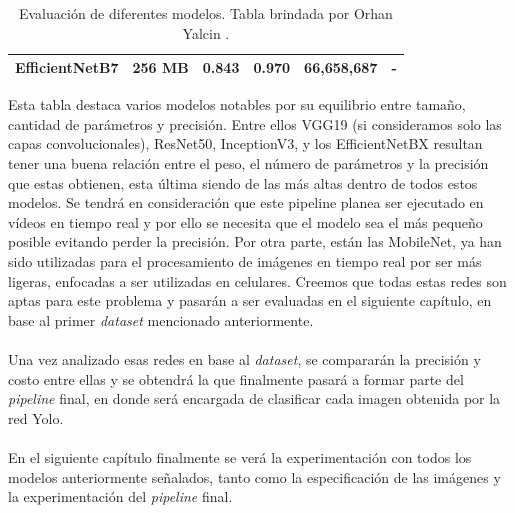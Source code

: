 \begin{table}[h!]
\begin{tabular}{|l|r|r|r|r|r|}
    EfficientNetB7                                               & 256 MB                             & 0.843                                                                                   & 0.970                                                                                   & 66,658,687                               & -                                   \\ \hline
    \end{tabular}
    \caption{Evaluación de diferentes modelos. Tabla brindada por Orhan Yalcin \protect\cite{DataModelos}. }
    \label{evaluación}
\end{table}


Esta tabla destaca varios modelos notables por su equilibrio entre 
tamaño, cantidad de parámetros y precisión. Entre ellos VGG19 
(si consideramos solo las capas convolucionales), ResNet50, InceptionV3, 
y los EfficientNetBX resultan tener una buena relación entre el peso, el 
número de parámetros y la precisión que estas obtienen, esta última 
siendo de las más altas dentro de todos estos modelos. Se tendrá en 
consideración que este pipeline planea ser ejecutado en vídeos en tiempo 
real y por ello se necesita que el modelo sea el más pequeño posible 
evitando perder la precisión. Por otra parte, están las MobileNet, ya han 
sido utilizadas para el procesamiento de imágenes en tiempo real por ser 
más ligeras, enfocadas a ser utilizadas en celulares. Creemos que todas 
estas redes son aptas para este problema y pasarán a ser evaluadas en el 
siguiente capítulo, en base al primer \textit{dataset} mencionado 
anteriormente. \\\\
Una vez analizado esas redes en base al \textit{dataset}, se compararán 
la precisión y costo entre ellas y se obtendrá la que finalmente pasará a 
formar parte del \textit{pipeline} final, en donde será encargada de 
clasificar cada imagen obtenida por la red Yolo.\\\\
En el siguiente capítulo finalmente se verá la experimentación con todos 
los modelos anteriormente señalados, tanto como la especificación de las 
imágenes y la experimentación del \textit{pipeline} final.

